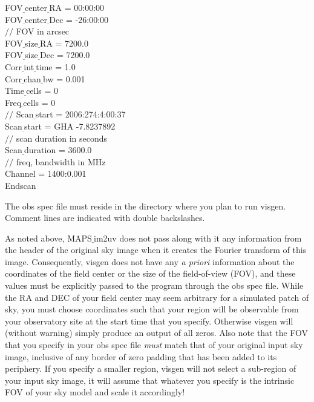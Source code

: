 \documentclass[12pt,psfig]{article}
\begin{document}
\smallskip
\begin{footnotesize}
\begin{flushleft}
FOV$\underline~$center$\underline~$RA = 00:00:00\\
FOV$\underline~$center$\underline~$Dec = -26:00:00\\
$//$ FOV in arcsec\\
FOV$\underline~$size$\underline~$RA = 7200.0\\
FOV$\underline~$size$\underline~$Dec = 7200.0\\
Corr$\underline~$int$\underline~$time = 1.0\\
Corr$\underline~$chan$\underline~$bw = 0.001\\
Time$\underline~$cells = 0\\
Freq$\underline~$cells = 0\\
\bigskip
$//$  Scan$\underline~$start = 2006:274:4:00:37\\
Scan$\underline~$start = GHA  -7.8237892\\
$//$ scan duration in seconds\\
  Scan$\underline~$duration = 3600.0\\
$//$ freq, bandwidth in MHz\\
  Channel = 1400:0.001\\
Endscan\\

\end{flushleft}
\end{footnotesize}
\smallskip

\noindent The obs spec file must reside in the directory where you plan to run
	  {\sf visgen}. Comment lines are indicated with double
	  backslashes.

As noted above, {\sf MAPS$\underline~$im2uv} does not pass along with
it any information from the header of the original sky
image when it creates the Fourier transform of this
image. 
Consequently, {\sf visgen} does not have any {\it a priori}
information about the coordinates of the
field center or the size of the field-of-view (FOV), and these values must
be explicitly passed to the program through the obs spec file. 
While the RA and DEC of your field center may seem arbitrary
for a simulated patch of sky, you must choose coordinates such that
your region will be observable from your observatory site at the start
time that you specify. Otherwise {\sf visgen} will (without warning) 
simply produce an
output of all zeros.
Also note that the FOV that you specify
in your obs spec file {\em must} match that of your original input
sky image, inclusive of any border of zero padding that has been added to its
periphery. If you specify a smaller region, {\sf
visgen} will not select a sub-region of your input sky image, it
will assume that whatever you specify is the intrinsic FOV of your 
sky model and scale
it accordingly!
\end{document}
